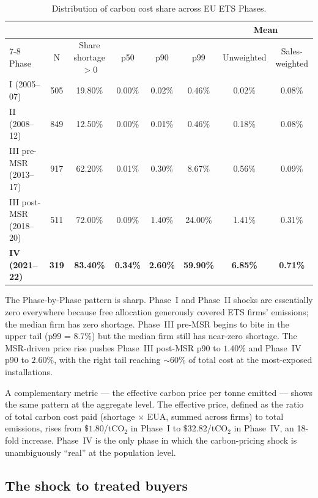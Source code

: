 \begin{table}[H]
    \centering
    \caption{Distribution of carbon cost share across EU ETS Phases.}
    \label{tab:firm_cost_share_by_phase}
    \footnotesize
    \begin{tabular}{lccccccc}
        \toprule
        & & & & & & \multicolumn{2}{c}{Mean} \\
        \cmidrule(lr){7-8}
        Phase & N & Share shortage $> 0$ & p50 & p90 & p99 & Unweighted & Sales-weighted \\
        \midrule
        I (2005--07)            & 505 & 19.80\% & 0.00\% & 0.02\% & 0.46\% & 0.02\% & 0.08\% \\
        II (2008--12)           & 849 & 12.50\% & 0.00\% & 0.01\% & 0.46\% & 0.18\% & 0.08\% \\
        III pre-MSR (2013--17)  & 917 & 62.20\% & 0.01\% & 0.30\% & 8.67\% & 0.56\% & 0.09\% \\
        III post-MSR (2018--20) & 511 & 72.00\% & 0.09\% & 1.40\% & 24.00\% & 1.41\% & 0.31\% \\
        \textbf{IV (2021--22)}  & \textbf{319} & \textbf{83.40\%} & \textbf{0.34\%} & \textbf{2.60\%} & \textbf{59.90\%} & \textbf{6.85\%} & \textbf{0.71\%} \\
        \bottomrule
    \end{tabular}
\end{table}

The Phase-by-Phase pattern is sharp. Phase~I and Phase~II shocks are essentially zero everywhere because free allocation generously covered ETS firms' emissions; the median firm has zero shortage. Phase~III pre-MSR begins to bite in the upper tail (p99 = 8.7\%) but the median firm still has near-zero shortage. The MSR-driven price rise pushes Phase~III post-MSR p90 to $1.40\%$ and Phase~IV p90 to $2.60\%$, with the right tail reaching $\sim$60\% of total cost at the most-exposed installations.

A complementary metric --- the effective carbon price per tonne emitted --- shows the same pattern at the aggregate level. The effective price, defined as the ratio of total carbon cost paid (shortage $\times$ EUA, summed across firms) to total emissions, rises from $\$1.80$/tCO$_2$ in Phase~I to $\$32.82$/tCO$_2$ in Phase~IV, an 18-fold increase. Phase~IV is the only phase in which the carbon-pricing shock is unambiguously ``real'' at the population level.

\subsection{The shock to treated buyers}\label{sec:shock_buyers}

